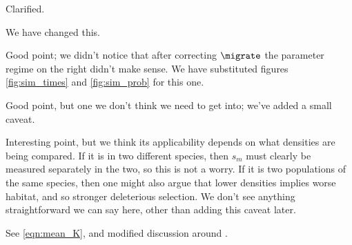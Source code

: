 
\reply
Clarified. 


\reply
We have changed this. 



\reply
Good point; we didn't notice that after correcting $\migrate$ the parameter regime on the right didn't make sense.
We have substituted figures \ref{fig:sim_times} and \ref{fig:sim_prob} for this one.

\point{[\eqref{eqn:total_migrate} assumes no interference}{ 
}

\reply
Good point, but one we don't think we need to get into; we've added a small caveat.



\reply
Interesting point,
but we think its applicability depends on what densities are being compared.
If it is in two different species, then $s_m$ must clearly be measured separately in the two,
so this is not a worry.
If it is two populations of the same species,
then one might also argue that lower densities implies worse habitat,
and so stronger deleterious selection.
We don't see anything straightforward we can say here, 
other than adding this caveat later. 


\reply
See \eqref{eqn:mean_K}, and modified discussion around .

